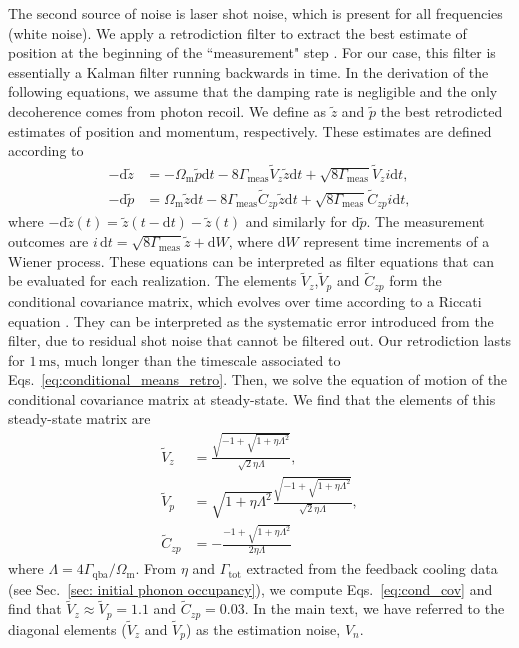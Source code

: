 \documentclass[aps, 
reprint, 
notitlepage,  superscriptaddress, 
onecolumn]{revtex4-1}
\newcommand{\<}{\langle}
\renewcommand{\>}{\rangle}
\newcommand{\dd}{\mathrm{d}}
\newcommand{\Om}{\Omega_\mathrm{m}}
\newcommand{\Gmeas}{\Gamma_\text{meas}}
\newcommand{\Gqba}{\Gamma_\text{qba}}
\newcommand{\Gtot}{\Gamma_\text{tot}}
\begin{document}
The second source of noise is laser shot noise, which is present for all frequencies (white noise).
%
We apply a retrodiction filter to extract the best estimate of position at the beginning of the ``measurement" step \cite{lammers_quantum_2024}.
%
For our case, this filter is essentially a Kalman filter running backwards in time.
%
In the derivation of the following equations, we assume that the damping rate is negligible and the only decoherence comes from photon recoil.
%
We define as $\tilde{z}$ and $\tilde{p}$ the best retrodicted estimates of position and momentum, respectively.
%
These estimates are defined according to
\begin{subequations}\label{eq:conditional_means_retro}
    \begin{align}
        -\dd\tilde{z}&=-\Om\tilde{p}\dd t-8\Gmeas \widetilde{V}_z\tilde{z}\dd t+\sqrt{8\Gmeas}\widetilde{V}_zi \dd t,\\
        -\dd\tilde{p}&=\Om\tilde{z}\dd t-8\Gmeas\widetilde{C}_{zp}\tilde{z}\dd t+\sqrt{8\Gmeas}\widetilde{C}_{zp}i\dd t,
    \end{align}
\end{subequations}
where $-\dd\tilde{z}(t)=\tilde{z}(t-\dd t)-\tilde{z}(t)$ and similarly for $\dd \tilde{p}$.
%
The measurement outcomes are $i\,\dd t=\sqrt{8\Gmeas}\tilde{z} + \dd W$, where $\dd W$ represent time increments of a Wiener process.
These equations can be interpreted as filter equations that can be evaluated for each realization.
%
The elements $\widetilde{V}_z$,$\widetilde{V}_p$ and $\widetilde{C}_{zp}$ form the conditional covariance matrix, which evolves over time according to a Riccati equation \cite{lammers_quantum_2024}.
%
They can be interpreted as the systematic error introduced from the filter, due to residual shot noise that cannot be filtered out.
%
Our retrodiction lasts for $1\,\mathrm{ms}$, much longer than the timescale associated to Eqs.~\eqref{eq:conditional_means_retro}.
%
Then, we solve the equation of motion of the conditional covariance matrix at steady-state. We find that the elements of this steady-state matrix are
\begin{subequations}\label{eq:cond_cov}
    \begin{align}
        \widetilde{V}_z&=\frac{\sqrt{-1+\sqrt{1+\eta\Lambda^2}}}{\sqrt{2}\eta\Lambda},\\        \widetilde{V}_p&=\sqrt{1+\eta\Lambda^2}\frac{\sqrt{-1+\sqrt{1+\eta\Lambda^2}}}{\sqrt{2}\eta\Lambda},\\
        \widetilde{C}_{zp}&=-\frac{-1+\sqrt{1+\eta\Lambda^2}}{2\eta\Lambda}
    \end{align}
\end{subequations}
where $\Lambda=4\Gqba/\Om$.
From $\eta$ and $\Gtot$ extracted from the feedback cooling data (see Sec.~\ref{sec: initial phonon occupancy}), we compute Eqs.~\eqref{eq:cond_cov} and find that $\widetilde{V}_z\approx\widetilde{V}_p=1.1$ and $\widetilde{C}_{zp}=0.03$.
In the main text, we have referred to the diagonal elements ($\widetilde{V}_z$ and $\widetilde{V}_p$) as the estimation noise, $V_n$.
\end{document}
